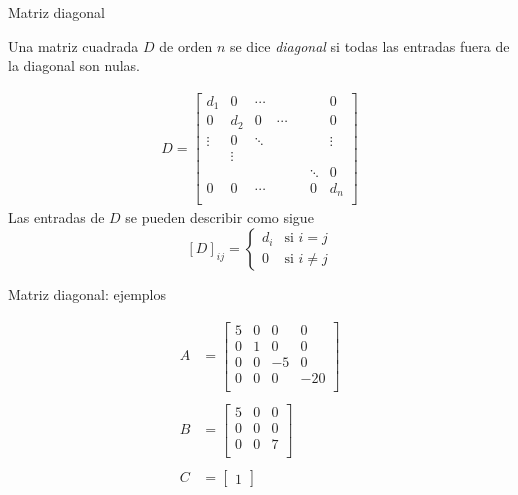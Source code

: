 \documentclass[handout]{beamer} %
\renewcommand{\_}[1]{_{\left[ #1 \right]}}
\renewcommand{\^}[1]{^{\left[ #1 \right]}}
\begin{document}
\begin{frame}{Matriz diagonal}
    
    Una matriz cuadrada $D$ de orden $n$ se dice \textit{diagonal} si todas las entradas fuera de la diagonal son nulas.
    
    \pause
    \begin{align*}
        D=
        \left[
        \begin{array}{ccccccc}
            d_1 & 0 & \cdots & & &  & 0\\ 
            0 & d_2 & 0& \cdots & &  & 0\\
            \vdots & 0 & \ddots & & &  & \vdots\\
            & \vdots &  & & & &  \\
            & &  & & &  \ddots&0\\
            0 & 0 & \cdots & & & 0 & d_{n}\\ 
        \end{array}
        \right]
    \end{align*}
    \pause
    Las entradas de $D$ se pueden describir como sigue 
    $$
    [D]_{ij}=\begin{cases}
        d_i&\mbox{si $i=j$}\\ 
        0&\mbox{si $i\neq j$}
    \end{cases}
    $$
\end{frame}


\begin{frame}{Matriz diagonal:  ejemplos }
    
    \begin{align*}
        A&=
        \begin{bmatrix}
            5 & 0 & 0 & 0\\ 
            0 & 1 & 0& 0\\
            0&0 & -5 & 0 \\
            0&0& 0 & -20 \\
        \end{bmatrix}
        \\
    &
        \\
        B&=
        \begin{bmatrix}
            5 &  0 & 0\\ 
            0 & 0  & 0\\
            0& 0 & 7 \\
        \end{bmatrix}
        \\
    &
        \\
        C&=
        \begin{bmatrix}
            1
        \end{bmatrix}
    \end{align*}

    \vskip 1cm
\end{frame}
\end{document}
